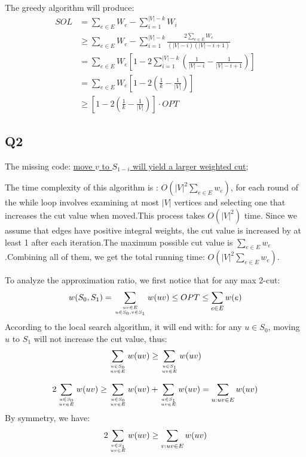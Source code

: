 \documentclass[a4paper, 12pt, titlepage]{article}
\begin{document}
The greedy algorithm will produce:
\begin{equation}
	\begin{aligned}
		SOL &= \sum_{e \in E} W_{e} - \sum_{i = 1}^{|V| - k} W_{i} \\
			&\geq \sum_{e \in E} W_{e} - \sum_{i = 1}^{|V| - k} \frac{2 \sum_{e \in E} W_{e} }{(|V| - i)(|V| -i + 1)} \\
			&= \sum_{e \in E} W_{e} \left[1 - 2 \sum_{i = 1}^{|V| - k} \left( \frac{1}{|V| - i} - \frac{1}{|V| - i + 1} \right) \right] \\
			&= \sum_{e \in E} W_{e} \left[1 - 2 \left(\frac{1}{k} - \frac{1}{|V|} \right) \right] \\
			&\geq \left[ 1 - 2 \left(\frac{1}{k} - \frac{1}{|V|} \right) \right] \cdot OPT
	\end{aligned}	
\end{equation}
	
\subsection{Q2}
The missing code:
\underline{move $v$ to $S_{1-i}$ will yield a larger weighted cut};

The time complexity of this algorithm is : $O(|V|^2 \sum_{e \in E} w_e)$, for each round of the while loop involves examining at most $|V|$ vertices and selecting one that increases the cut
value when moved.This process takes $O(|V|^2)$ time. Since we assume that edges have positive integral weights, the cut value is increased by at least 1 after each iteration.The maximum
possible cut value is $\sum_{e \in E} w_e$.Combining all of them, we get the total running time: $O(|V|^2 \sum_{e \in E} w_e)$.

To analyze the approximation ratio, we first notice that for any max 2-cut:
\[
    w(S_0, S_1) = \sum_{uv \in E \atop u \in S_0, v \in S_1} w(uv) \leq OPT \leq \sum_{e \in E} w(e) 
\]
According to the local search algorithm, it will end with: for any $u \in S_0$, moving $u$ to $S_1$ will not increase the cut value, thus:
\[
    \sum_{u \in S_0 \atop uv \in E} w(uv) \geq  \sum_{u \in S_1 \atop uv \in E} w(uv) 
\]

\begin{equation}\label{eq:eq1}
    2 \sum_{u \in S_0 \atop uv \in E} w(uv) \geq \sum_{u \in S_0 \atop uv \in E} w(uv) + \sum_{u \in S_1 \atop uv \in E} w(uv) = \sum_{u: uv \in E} w(uv)
\end{equation}
By symmetry, we have:
\begin{equation}\label{eq:eq2}
    2 \sum_{v \in S_1 \atop uv \in E} w(uv) \geq  \sum_{v: uv \in E} w(uv)
\end{equation}
\end{document}
